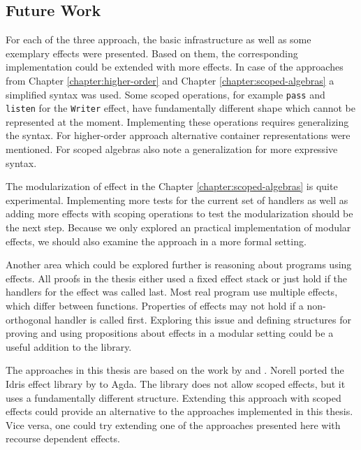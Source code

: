 \documentclass[10pt,a4paper,twoside,notitlepage]{report}
\begin{document}
\subsection{Future Work}

For each of the three approach, the basic infrastructure as well as some
exemplary effects were presented.
Based on them, the corresponding implementation could be extended with more
effects.
In case of the approaches from Chapter \ref{chapter:higher-order} and Chapter
\ref{chapter:scoped-algebras} a simplified syntax was used.
Some scoped operations, for example \texttt{pass} and \texttt{listen} for the
\texttt{Writer} effect, have fundamentally different shape which cannot be
represented at the moment.
Implementing these operations requires generalizing the syntax.
For higher-order approach alternative container representations were mentioned.
For scoped algebras \textcite{DBLP:conf/lics/PirogSWJ18} also note a
generalization for more expressive syntax.

The modularization of effect in the Chapter \ref{chapter:scoped-algebras} is
quite experimental.
Implementing more tests for the current set of handlers as well as adding more
effects with scoping operations to test the modularization should be the next
step.
Because we only explored an practical implementation of modular effects, we
should also examine the approach in a more formal setting.

Another area which could be explored further is reasoning about programs using
effects.
All proofs in the thesis either used a fixed effect stack or just hold if the
handlers for the effect was called last.
Most real program use multiple effects, which differ between functions.
Properties of effects may not hold if a non-orthogonal handler is called first.
Exploring this issue and defining structures for proving and using propositions
about effects in a modular setting could be a useful addition to the library.

The approaches in this thesis are based on the work by
\textcite{DBLP:conf/haskell/WuSH14} and \textcite{DBLP:conf/lics/PirogSWJ18}.
Norell ported the Idris effect library by \textcite{DBLP:conf/icfp/Brady13} to
Agda.
The library does not allow scoped effects, but it uses a fundamentally different
structure.
Extending this approach with scoped effects could provide an alternative to the
approaches implemented in this thesis.
Vice versa, one could try extending one of the approaches presented here with
recourse dependent effects.
\end{document}
